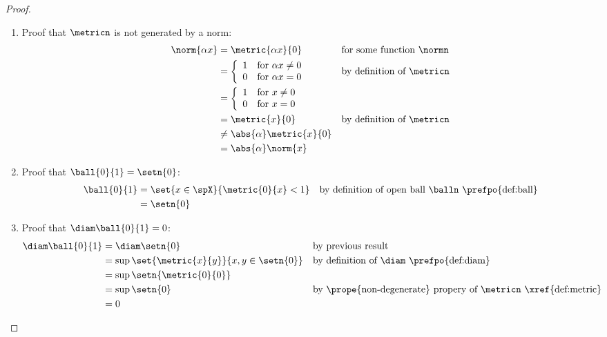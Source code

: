 \begin{proof}
\begin{enumerate}
  \item Proof that $\metricn$ is not generated by a norm:
    \begin{align*}
      \norm{\alpha x}
        &= \metric{\alpha x}{0}
        && \text{for some function $\normn$}
      \\&= \left\{\begin{array}{ll}1 &\text{for } \alpha x\ne 0 \\0&\text{for }\alpha x=0 \end{array} \right.
        && \text{by definition of $\metricn$}
      \\&= \left\{\begin{array}{ll}1 &\text{for } x\ne 0 \\0&\text{for } x=0 \end{array} \right.
      \\&= \metric{x}{0}
        && \text{by definition of $\metricn$}
      \\&\ne  \abs{\alpha}\metric{x}{0}
      \\&= \abs{\alpha}\norm{x}
    \end{align*}

  \item Proof that $\ball{0}{1}=\setn{0}$:
    \begin{align*}
      \ball{0}{1}
        &= \set{x\in\spX}{\metric{0}{x}<1}
        && \text{by definition of open ball $\balln$ \prefpo{def:ball}}
      \\&= \setn{0}
    \end{align*}

  \item Proof that $\diam\ball{0}{1}=0$:
    \begin{align*}
      \diam\ball{0}{1}
        &= \diam\setn{0}
        && \text{by previous result}
      \\&= \sup\set{\metric{x}{y}}{x,y\in\setn{0}}
        && \text{by definition of $\diam$ \prefpo{def:diam}}
      \\&= \sup\setn{\metric{0}{0}}
      \\&= \sup\setn{0}
        && \text{by \prope{non-degenerate} propery of $\metricn$ \xref{def:metric}}
      \\&= 0
    \end{align*}

  \end{enumerate}
\end{proof}


